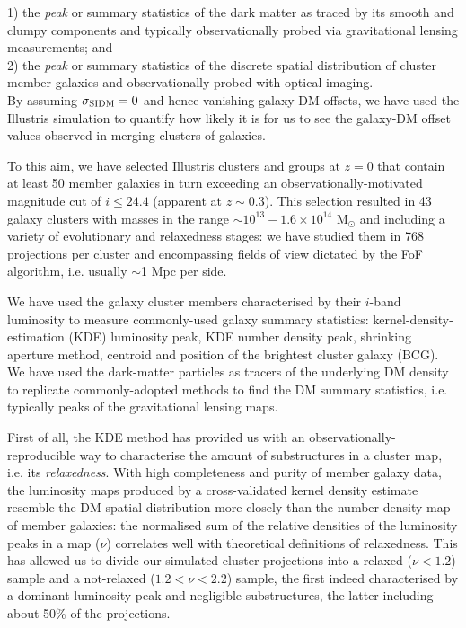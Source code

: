 \documentclass[usenatbib]{mn2e}
\begin{document}
{1) the {\it peak} or summary statistics of the dark matter as traced by its smooth and clumpy components and typically observationally probed via gravitational lensing measurements; and \\

2) the {\it peak} or summary statistics of the discrete spatial distribution of cluster member galaxies and observationally probed with optical imaging.\\

By assuming $\sigma_{\rm SIDM} = 0$ and hence vanishing galaxy-DM offsets, we have used the Illustris simulation to quantify how likely it is for us to see the galaxy-DM offset values observed in merging clusters of galaxies.

To this aim, we have selected Illustris clusters and groups at $z=0$ that contain at least 50 member galaxies in turn exceeding an observationally-motivated magnitude cut of $i \leq 24.4$ (apparent at $z\sim0.3$). This selection resulted in 43 galaxy clusters with masses in the range $\sim 10^{13} - 1.6 \times 10^{14}$ M$_\odot $ and including a variety of evolutionary and relaxedness stages: we have studied them in 768 projections per cluster and encompassing fields of view dictated by the {\sc FoF} algorithm, i.e. usually $\sim $1 Mpc per side. 

We have used the galaxy cluster members characterised by their $i$-band luminosity to measure commonly-used galaxy summary statistics: kernel-density-estimation (KDE) luminosity peak, KDE number density peak, shrinking aperture method, centroid and position of the brightest cluster galaxy (BCG). We have used the dark-matter particles as tracers of the underlying DM density to replicate commonly-adopted methods to find the DM summary statistics, i.e. typically peaks of the gravitational lensing maps. 

First of all, the KDE method has provided us with an observationally-reproducible way to characterise the amount of substructures in a cluster map, i.e. its {\it relaxedness}. With high completeness and purity of member galaxy data, the luminosity maps produced by a cross-validated kernel density estimate resemble the DM spatial distribution more closely than the number density map of member galaxies: the normalised sum of the relative densities of the luminosity peaks in a map ($\nu$) correlates well with theoretical definitions of relaxedness. This has allowed us to divide our simulated cluster projections into a relaxed ($\nu < 1.2$) sample and a not-relaxed ($1.2 < \nu < 2.2$) sample, the first indeed characterised by a dominant luminosity peak and negligible substructures, the latter including about 50\% of the projections. \\

}
\end{document}
